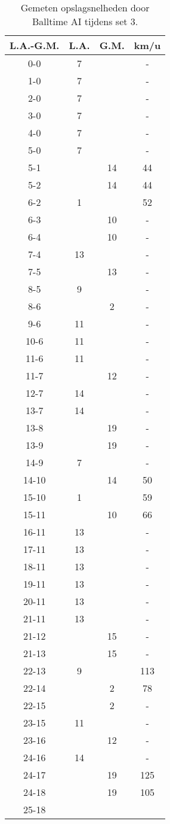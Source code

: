 \begin{table}[ht!]
  \centering
  \scriptsize
  \begin{tabular}{|c|c|c|c|} \hline
    L.A.-G.M. & L.A. & G.M. & km/u \\ \hline
    0-0 & 7 & & - \\
    1-0 & 7 & & - \\
    2-0 & 7 & & - \\
    3-0 & 7 & & - \\
    4-0 & 7 & & - \\
    5-0 & 7 & & - \\
    5-1 & & 14 & 44 \\
    5-2 & & 14 & 44 \\
    6-2 & 1 & & 52 \\
    6-3 & & 10 & - \\
    6-4 & & 10 & - \\
    7-4 & 13 & & - \\
    7-5 &  & 13 & - \\
    8-5 & 9 & & - \\
    8-6 &  & 2 & - \\
    9-6 & 11 & & - \\
    10-6 & 11 & & - \\
    11-6 & 11 & & - \\
    11-7 & & 12 & - \\
    12-7 & 14 & & - \\
    13-7 & 14 & & - \\
    13-8 & & 19 & - \\
    13-9 & & 19 & - \\
    14-9 & 7 & & - \\
    14-10 & & 14 & 50 \\
    15-10 & 1 & & 59 \\
    15-11 & & 10 & 66 \\
    16-11 & 13 & & - \\
    17-11 & 13 & & - \\
    18-11 & 13 & & - \\
    19-11 & 13 & & - \\
    20-11 & 13 & & - \\
    21-11 & 13 & & - \\
    21-12 & & 15 & - \\
    21-13 & & 15 & - \\
    22-13 & 9 & & 113 \\
    22-14 & & 2 & 78 \\
    22-15 & & 2 & - \\
    23-15 & 11 & & - \\
    23-16 & & 12 & - \\
    24-16 & 14 & & - \\
    24-17 & & 19 & 125 \\
    24-18 & & 19 & 105 \\
    25-18 & & & \\ \hline
  \end{tabular}
  \caption[Gemeten opslagsnelheden door Balltime AI tijdens set 3]{\label{tab:PL1ServeAI3}Gemeten opslagsnelheden door Balltime AI tijdens set 3.}
\end{table}